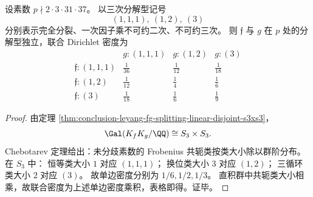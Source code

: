 \begin{theorem}\label{thm:conclusion-leyang-fg-splitting-type-independent-density}
设素数 \(p\nmid 2\cdot 3\cdot 31\cdot 37\)。
以三次分解型记号
\[
(1,1,1),\ (1,2),\ (3)
\]
分别表示完全分裂、一次因子乘不可约二次、不可约三次。
则 \(\mathfrak f\) 与 \(g\) 在 \(p\) 处的分解型独立，联合 Dirichlet 密度为
\[
\begin{array}{c|ccc}
& g:(1,1,1) & g:(1,2) & g:(3)\\ \hline
\mathfrak f:(1,1,1) & \frac1{36} & \frac1{12} & \frac1{18}\\
\mathfrak f:(1,2)   & \frac1{12} & \frac1{4}  & \frac1{6}\\
\mathfrak f:(3)     & \frac1{18} & \frac1{6}  & \frac1{9}
\end{array}
\]
\end{theorem}
\begin{proof}
由定理 \ref{thm:conclusion-leyang-fg-splitting-linear-disjoint-s3xs3}，
\[
\Gal(K_fK_g/\QQ)\cong S_3\times S_3.
\]
Chebotarev 定理给出：未分歧素数的 Frobenius 共轭类按类大小除以群阶分布。
在 \(S_3\) 中：
恒等类大小 \(1\) 对应 \((1,1,1)\)；
换位类大小 \(3\) 对应 \((1,2)\)；
三循环类大小 \(2\) 对应 \((3)\)。
故单边密度分别为 \(1/6,1/2,1/3\)。
直积群中共轭类大小相乘，故联合密度为上述单边密度乘积，表格即得。证毕。
\end{proof}

